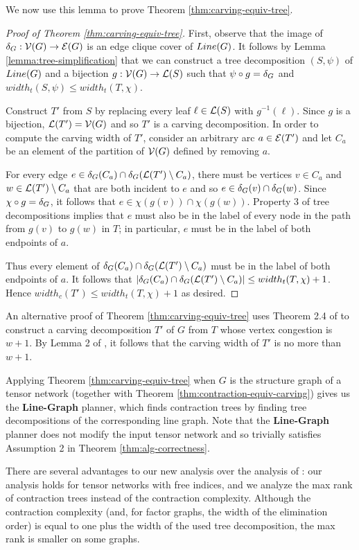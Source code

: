 We now use this lemma to prove Theorem \ref{thm:carving-equiv-tree}.

\begin{proof}[Proof of Theorem \ref{thm:carving-equiv-tree}]
First, observe that the image of $\delta_{G}: \mathcal{V}(G) \rightarrow \mathcal{E}(G)$ is an edge clique cover of $Line(G)$. It follows by Lemma \ref{lemma:tree-simplification} that we can construct a tree decomposition $(S, \psi)$ of $Line(G)$ and a bijection $g: \mathcal{V}(G) \rightarrow \mathcal{L}(S)$ such that $\psi \circ g = \delta_{G}$ and $width_t(S, \psi) \leq width_t(T, \chi)$.

Construct $T'$ from $S$ by replacing every leaf $\ell \in \mathcal{L}(S)$ with $g^{-1}(\ell)$. Since $g$ is a bijection, $\mathcal{L}(T') = \mathcal{V}(G)$ and so $T'$ is a carving decomposition. In order to compute the carving width of $T'$, consider an arbitrary arc $a \in \mathcal{E}(T')$ and let $C_a$ be an element of the partition of $\mathcal{V}(G)$ defined by removing $a$. 

For every edge $e \in \delta_{G}(C_a) \cap \delta_{G}(\mathcal{L}(T') \setminus C_a)$, there must be vertices $v \in C_a$ and $w \in \mathcal{L}(T') \setminus C_a$ that are both incident to $e$ and so $e \in \delta_{G}(v) \cap \delta_{G}(w)$. Since $\chi \circ g = \delta_{G}$, it follows that $e \in \chi(g(v)) \cap \chi(g(w))$.  Property 3 of tree decompositions implies that $e$ must also be in the label of every node in the path from $g(v)$ to $g(w)$ in $T$; in particular, $e$ must be in the label of both endpoints of $a$.

Thus every element of $\delta_{G}(C_a) \cap \delta_{G}(\mathcal{L}(T') \setminus C_a)$ must be in the label of both endpoints of $a$. It follows that $|\delta_{G}(C_a) \cap \delta_{G}(\mathcal{L}(T') \setminus C_a)| \leq width_t(T, \chi)+1$. Hence $width_c(T') \leq width_t(T, \chi)+1$ as desired.
\end{proof}

An alternative proof of Theorem \ref{thm:carving-equiv-tree} uses Theorem 2.4 of \cite{HW18} to construct a carving decomposition $T'$ of $G$ from $T$ whose vertex congestion is $w+1$. By Lemma 2 of \cite{ACDJPS07}, it follows that the carving width of $T'$ is no more than $w+1$.

Applying Theorem \ref{thm:carving-equiv-tree} when $G$ is the structure graph of a tensor network (together with Theorem \ref{thm:contraction-equiv-carving}) gives us the \textbf{Line-Graph} planner, which finds contraction trees by finding tree decompositions of the corresponding line graph. Note that the \textbf{Line-Graph} planner does not modify the input tensor network and so trivially satisfies Assumption 2 in Theorem \ref{thm:alg-correctness}.

There are several advantages to our new analysis over the analysis of \cite{MS08}: our analysis holds for tensor networks with free indices, and we analyze the max rank of contraction trees instead of the contraction complexity. Although the contraction complexity (and, for factor graphs, the width of the elimination order) is equal to one plus the width of the used tree decomposition, the max rank is smaller on some graphs.
